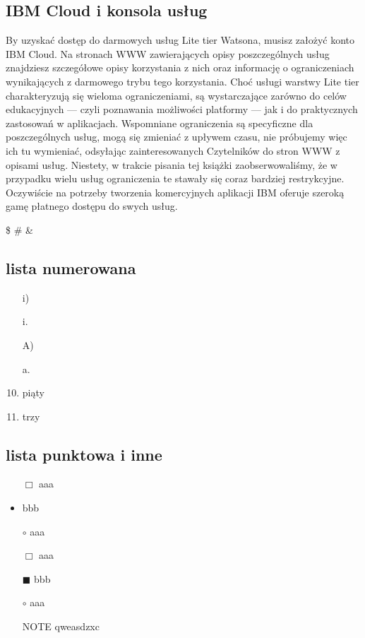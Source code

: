 \documentclass[11pt,a4paper,fleqn,leqno,titlepage]{article}
\begin{document}
\subsection{IBM Cloud i konsola usług}
By uzyskać dostęp do darmowych usług Lite tier Watsona, musisz założyć konto IBM Cloud.
Na stronach WWW zawierających opisy poszczególnych usług znajdziesz szczegółowe opisy
korzystania z nich oraz informację o ograniczeniach wynikających z darmowego trybu tego
korzystania. Choć usługi warstwy Lite tier charakteryzują się wieloma ograniczeniami, są wystarczające zarówno do celów edukacyjnych — czyli poznawania możliwości platformy — jak i do
praktycznych zastosowań w aplikacjach. Wspomniane ograniczenia są specyficzne dla poszczególnych usług, mogą się zmieniać z upływem czasu, nie próbujemy więc ich tu wymieniać, odsyłając zainteresowanych Czytelników do stron WWW z opisami usług. Niestety, w trakcie pisania
tej książki zaobserwowaliśmy, że w przypadku wielu usług ograniczenia te stawały się coraz
bardziej restrykcyjne. Oczywiście na potrzeby tworzenia komercyjnych aplikacji IBM oferuje
szeroką gamę płatnego dostępu do swych usług.
\newline

\$
\# %
\& %
\newpage

\subsection{lista numerowana}

\begin{enumerate}
\setcounter{enumi}{5}
\item [i)]
\item [i.]
\item [A)]
\item [a.]
\item piąty
\item trzy

\end{enumerate}

\subsection{lista punktowa i inne}

\begin{itemize}
\item[$\Box$] aaa
\item bbb
\item[$\circ$] aaa
\end{itemize}



\begin{itemize}
\item[$\Box$] aaa
\item[$\blacksquare$] bbb
\item[$\circ$] aaa
\item[NOTE] qweasdzxc
\end{itemize}
\end{document}
